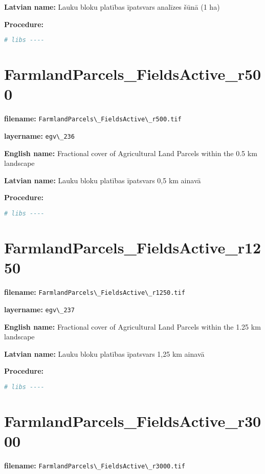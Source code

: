 \documentclass[
]{book}
\newcommand{\passthrough}[1]{#1}
\begin{document}
\textbf{Latvian name:} Lauku bloku platības īpatsvars analīzes šūnā (1 ha)

\textbf{Procedure:}

\begin{lstlisting}[language=R]
# libs ----
\end{lstlisting}

\section{FarmlandParcels\_FieldsActive\_r500}\label{ch06.236}

\textbf{filename:} \passthrough{\lstinline!FarmlandParcels\_FieldsActive\_r500.tif!}

\textbf{layername:} \passthrough{\lstinline!egv\_236!}

\textbf{English name:} Fractional cover of Agricultural Land Parcels within the 0.5 km landscape

\textbf{Latvian name:} Lauku bloku platības īpatsvars 0,5 km ainavā

\textbf{Procedure:}

\begin{lstlisting}[language=R]
# libs ----
\end{lstlisting}

\section{FarmlandParcels\_FieldsActive\_r1250}\label{ch06.237}

\textbf{filename:} \passthrough{\lstinline!FarmlandParcels\_FieldsActive\_r1250.tif!}

\textbf{layername:} \passthrough{\lstinline!egv\_237!}

\textbf{English name:} Fractional cover of Agricultural Land Parcels within the 1.25 km landscape

\textbf{Latvian name:} Lauku bloku platības īpatsvars 1,25 km ainavā

\textbf{Procedure:}

\begin{lstlisting}[language=R]
# libs ----
\end{lstlisting}

\section{FarmlandParcels\_FieldsActive\_r3000}\label{ch06.238}

\textbf{filename:} \passthrough{\lstinline!FarmlandParcels\_FieldsActive\_r3000.tif!}
\end{document}

